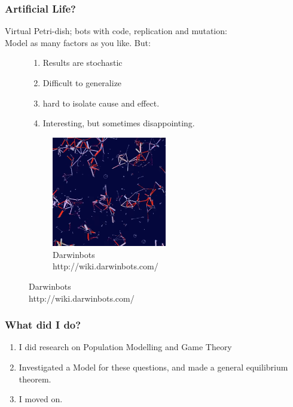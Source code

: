 \documentclass{beamer}
\begin{document}
\begin{frame}
\frametitle{Artificial Life?}
Virtual Petri-dish; bots with code, replication and mutation:\\
Model as many factors as you like. But:
\begin{figure}
\begin{minipage}{5cm}
\begin{enumerate}
\item Results are stochastic
\item Difficult to generalize
\item hard to isolate cause and effect.
\item Interesting, but sometimes disappointing.
\end{enumerate}
\end{minipage}
\begin{minipage}{5cm}
\begin{figure}
    \centering
    \includegraphics[width=5cm]{darwinbots_shot.png}
    \caption{Darwinbots\\http://wiki.darwinbots.com/}
\end{figure}
\end{minipage}
\end{figure}
\end{frame}




\begin{frame}
\frametitle{What did I do?}
\begin{enumerate}
\item I did research on Population Modelling and Game Theory
\item Investigated a Model for these questions, and made a general equilibrium theorem.
\item I moved on.
\end{enumerate}

\end{frame}
\end{document}
